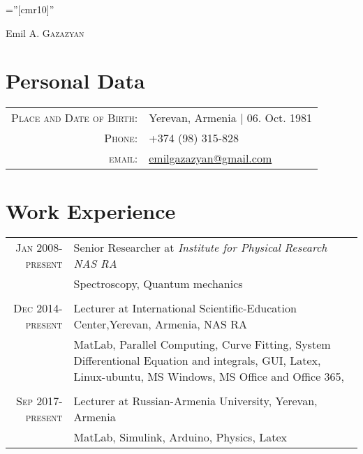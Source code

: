 \documentclass[a4paper,10pt]{article}
\begin{document}

\pagestyle{empty} %

\font\fb=''[cmr10]'' %

\par{\centering
		{\Huge Emil A. \textsc{Gazazyan}
	}\bigskip\par}

\section{Personal Data}

\begin{tabular}{rl}
    \textsc{Place and Date of Birth:} & Yerevan, Armenia  | 06. Oct. 1981 \\
    \textsc{Phone:}     & +374 (98) 315-828\\
    \textsc{email:}     & \href{mailto:emilgazazyan@gmail.com}{emilgazazyan@gmail.com}
\end{tabular}

\section{Work Experience}
\begin{tabular}{r|p{11cm}}
  \textsc{Jan 2008- present}& Senior Researcher at \emph{Institute for Physical Research NAS RA}\\&\footnotesize{Spectroscopy, Quantum mechanics }\\\multicolumn{2}{c}{}
 \\
 \textsc{Dec 2014-present} & Lecturer at International Scientific-Education Center,Yerevan, Armenia, NAS RA \\&\footnotesize{MatLab, Parallel Computing, Curve Fitting, System Differentional Equation and integrals, GUI, Latex, Linux-ubuntu, MS Windows, MS Office and Office 365, }\\\multicolumn{2}{c}{} 
 \\
\textsc{Sep 2017-present} & Lecturer at  Russian-Armenia University, Yerevan, Armenia \\&\footnotesize{ MatLab, Simulink, Arduino, Physics, Latex}
\end{tabular}
\end{document}
